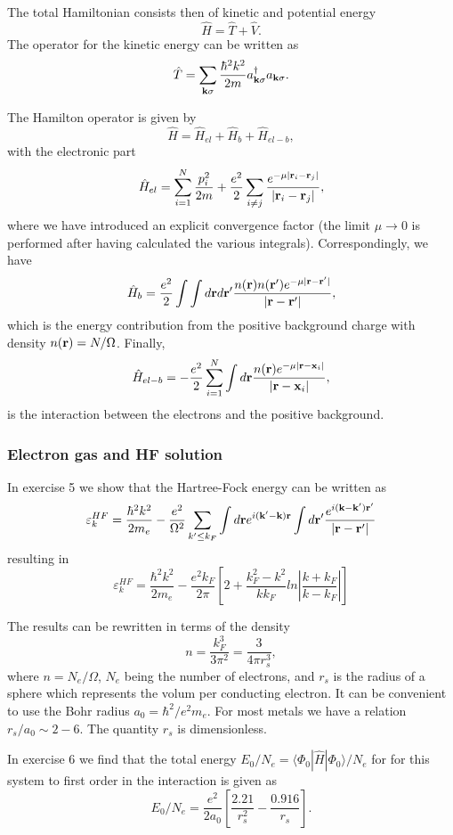 \documentclass{beamer}
\begin{document}
\begin{frame}
\begin{block}{}
The total Hamiltonian consists then of kinetic and potential energy
\[
\hat{H} = \hat{T}+\hat{V}.
\]
The operator for the kinetic energy can be written as
\[
\hat{T}=\sum_{{\bf k}\sigma}\frac{\hbar^2k^2}{2m}a_{{\bf k}\sigma}^{\dagger}a_{{\bf k}\sigma}.
\]

The Hamilton operator is given by
\[
\hat{H}=\hat{H}_{el}+\hat{H}_{b}+\hat{H}_{el-b},
\]
with the electronic part
\[
\hat{H}_{el}=\sum_{i=1}^N\frac{p_i^2}{2m}+\frac{e^2}{2}\sum_{i\ne j}\frac{e^{-\mu |{\bf r}_i-{\bf r}_j|}}{|{\bf r}_i-{\bf r}_j|},
\]
where we have introduced an explicit convergence factor
(the limit $\mu\rightarrow 0$ is performed after having calculated the various integrals).
Correspondingly, we have
\[
\hat{H}_{b}=\frac{e^2}{2}\int\int d{\bf r}d{\bf r}'\frac{n({\bf r})n({\bf r}')e^{-\mu |{\bf r}-{\bf r}'|}}{|{\bf r}-{\bf r}'|},
\]
which is the energy contribution from the positive background charge with density
$n({\bf r})=N/\Omega$. Finally,
\[
\hat{H}_{el-b}=-\frac{e^2}{2}\sum_{i=1}^N\int d{\bf r}\frac{n({\bf r})e^{-\mu |{\bf r}-{\bf x}_i|}}{|{\bf r}-{\bf x}_i|},
\]
is the interaction between the electrons and the positive background.
\end{block}
\end{frame}

\begin{frame}
\frametitle{Electron gas and HF solution}

\begin{block}{}
In exercise 5 we show that the Hartree-Fock energy can be written as 
\[
\varepsilon_{k}^{HF}=\frac{\hbar^{2}k^{2}}{2m_e}-\frac{e^{2}}
{\Omega^{2}}\sum_{k'\leq
k_{F}}\int d{\bf r}e^{i({\bf k}'-{\bf k}){\bf r}}\int
d{\bf r'}\frac{e^{i({\bf k}-{\bf k}'){\bf r}'}}
{\vert{\bf r}-{\bf r}'\vert}
\]
resulting in
\[
\varepsilon_{k}^{HF}=\frac{\hbar^{2}k^{2}}{2m_e}-\frac{e^{2}
k_{F}}{2\pi}
\left[
2+\frac{k_{F}^{2}-k^{2}}{kk_{F}}ln\left\vert\frac{k+k_{F}}
{k-k_{F}}\right\vert
\right]
\]

The results can be rewritten in terms of the density
\[
n= \frac{k_F^3}{3\pi^2}=\frac{3}{4\pi r_s^3},
\]
where $n=N_e/\Omega$, $N_e$ being the number of electrons, and $r_s$ is the radius of a sphere which represents the volum per conducting electron.  
It can be convenient to use the Bohr radius $a_0=\hbar^2/e^2m_e$.
For most metals we have a relation $r_s/a_0\sim 2-6$.  The quantity $r_s$ is dimensionless.

In exercise 6 we find that
the total energy
$E_0/N_e=\langle\Phi_{0}|\hat{H}|\Phi_{0}\rangle/N_e$ for
for this system to first order in the interaction is given as 
\[
E_0/N_e=\frac{e^2}{2a_0}\left[\frac{2.21}{r_s^2}-\frac{0.916}{r_s}\right].
\]

\end{block}
\end{frame}
\end{document}
